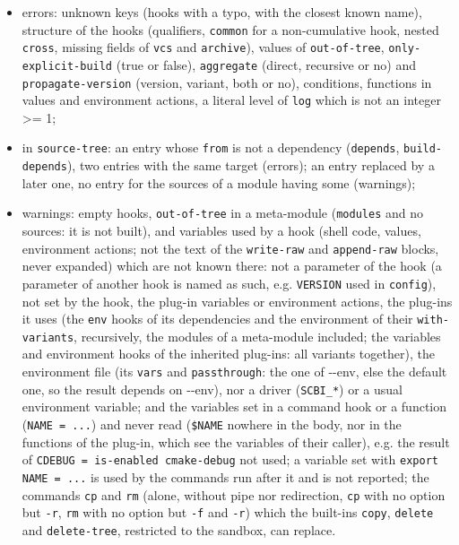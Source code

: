\documentclass[a4paper,12pt,twoside]{article}
\newcommand{\code}[1]{\texttt{#1}}
\newcommand{\ddash}{-{}-}
\begin{document}
\begin{itemize}
	\item errors: unknown keys (hooks with a typo, with the closest
	known name), structure of the hooks (qualifiers, \code{common} for a
	non-cumulative hook, nested \code{cross}, missing fields of
	\code{vcs} and \code{archive}), values of \code{out-of-tree},
	\code{only-explicit-build} (true or false), \code{aggregate} (direct,
	recursive or no) and \code{propagate-version} (version, variant, both
	or no), conditions, functions in values and environment actions, a
	literal level of \code{log} which is not an integer >= 1;
	\item in \code{source-tree}: an entry whose \code{from} is not a
	dependency (\code{depends}, \code{build-depends}), two entries with the
	same target (errors); an entry replaced by a later one, no entry for
	the sources of a module having some (warnings);
	\item warnings: empty hooks, \code{out-of-tree} in a meta-module
	(\code{modules} and no sources: it is not built), and variables used by a hook (shell code,
	values, environment actions; not the text of the \code{write-raw}
	and \code{append-raw} blocks, never expanded) which are not known there: not a
	parameter of the hook (a parameter of another hook is named as such,
	e.g. \code{VERSION} used in \code{config}), not set by the hook, the
	plug-in variables or environment actions, the plug-ins it uses (the
	\code{env} hooks of its dependencies and the environment of their
	\code{with-variants}, recursively, the modules of a meta-module
	included; the variables and environment hooks of the
	inherited plug-ins: all variants together), the environment file (its
	\code{vars} and \code{passthrough}: the one of \ddash{}env, else the
	default one, so the result depends on \ddash{}env), nor a driver
	(\code{SCBI\_*}) or a usual environment variable; and the variables
	set in a command hook or a function (\code{NAME = ...}) and never
	read (\code{\$NAME} nowhere in the body, nor in the functions of the
	plug-in, which see the variables of their caller), e.g. the result of
	\code{CDEBUG = is-enabled cmake-debug} not used; a variable set with
	\code{export NAME = ...} is used by the commands run after it and is
	not reported; the commands \code{cp} and \code{rm} (alone, without
	pipe nor redirection, \code{cp} with no option but \code{-r},
	\code{rm} with no option but \code{-f} and \code{-r}) which the
	built-ins \code{copy}, \code{delete} and \code{delete-tree},
	restricted to the sandbox, can replace.
\end{itemize}
\end{document}
